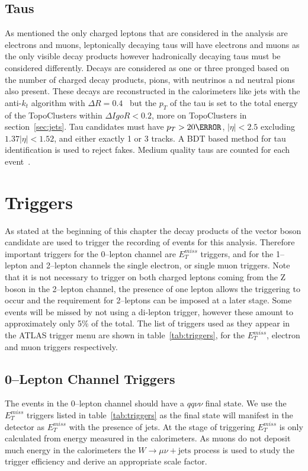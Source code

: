 \subsection{Taus}

As mentioned the only charged leptons that are considered in the analysis are
electrons and muons, leptonically decaying taus will have electrons and muons as
the only visible decay products however hadronically decaying taus must be
considered differently. Decays are considered as one or three pronged based on
the number of charged decay products, pions, with neutrinos a
nd neutral pions
also present. These decays are reconstructed in the calorimeters like jets with
the anti-$k_t$ algorithm with $\Delta R = 0.4$~\cite{ATL-PHYS-PUB-2015-045} but
the $p_T$ of the tau is set to the total energy of the TopoClusters within
$\Delta I goR < 0.2$, more on TopoClusters in section~\ref{sec:jets}. Tau
candidates must have $p_T > 20 \GeV$, $\lvert  \eta \rvert < 2.5$ excluding
$1.37 \lvert \eta \rvert < 1.52$, and either exactly 1 or 3 tracks. A BDT based
method for tau identification is used to reject fakes. Medium quality taus are
counted for each event~\cite{TauRecommendation2015,TauRecommendation2016}.

\section{Triggers}
\label{sec:triggers}

As stated at the beginning of this chapter the decay products of the vector
boson candidate are used to trigger the recording of events for this analysis.
Therefore important triggers for the 0--lepton channel are $E_T^{miss}$ triggers,
and for the 1--lepton and 2--lepton channels the single electron, or single muon
triggers. Note that it is not necessary to trigger on both charged leptons
coming from the Z boson in the 2--lepton channel, the presence of one lepton
allows the triggering to occur and the requirement for 2--leptons can be imposed
at a later stage. Some events will be missed by not using a di-lepton trigger,
however these amount to approximately only 5\% of the total. The list of
triggers used as they appear in the ATLAS trigger menu are shown in
table~\ref{tab:triggers}, for the $E_T^{miss}$, electron and muon triggers
respectively.


\subsection{0--Lepton Channel Triggers}
The events in the 0--lepton channel should have a $qq\nu\nu$ final state. We use
the $E_T^{miss}$ triggers listed in table~\ref{tab:triggers} as the final state
will manifest in the detector as $E_T^{miss}$ with the presence of jets. At the
stage of triggering $E_T^{miss}$ is only calculated from energy measured in the
calorimeters. As muons do not deposit much energy in the calorimeters the $W
\rightarrow \mu \nu + \text{jets}$ process is used to study the trigger
efficiency and derive an appropriate scale factor.


